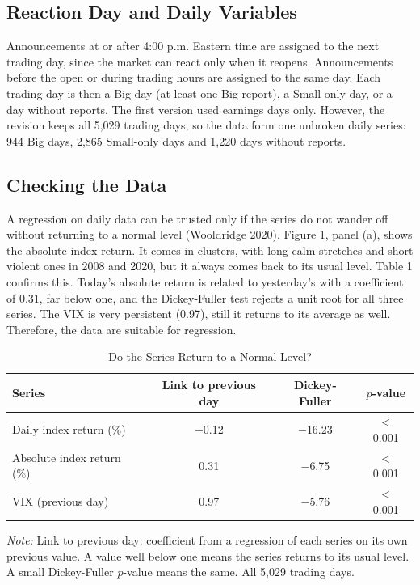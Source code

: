 \documentclass[preprint,letterpaper,11pt,authoryear]{elsarticle}
\newenvironment{tablenotes}{\par\vspace{3pt}\begin{minipage}{0.95\linewidth}\footnotesize\textit{Note:} }{\end{minipage}}
\begin{document}
\subsection{Reaction Day and Daily Variables}
Announcements at or after 4:00 p.m. Eastern time are assigned to the next trading day, since the market can react only when it reopens. Announcements before the open or during trading hours are assigned to the same day. Each trading day is then a Big day (at least one Big report), a Small-only day, or a day without reports. The first version used earnings days only. However, the revision keeps all 5,029 trading days, so the data form one unbroken daily series: 944 Big days, 2,865 Small-only days and 1,220 days without reports.

\subsection{Checking the Data}
A regression on daily data can be trusted only if the series do not wander off without returning to a normal level (Wooldridge 2020). Figure 1, panel (a), shows the absolute index return. It comes in clusters, with long calm stretches and short violent ones in 2008 and 2020, but it always comes back to its usual level. Table 1 confirms this. Today's absolute return is related to yesterday's with a coefficient of 0.31, far below one, and the Dickey-Fuller test rejects a unit root for all three series. The VIX is very persistent (0.97), still it returns to its average as well. Therefore, the data are suitable for regression.

\begin{table}[!htbp]
\centering\small\setlength{\tabcolsep}{4pt}
\caption{Do the Series Return to a Normal Level?}
\begin{tabular}{lccc}
\toprule
Series & Link to previous day & Dickey-Fuller & $p$-value \\
\midrule
Daily index return (\%) & $-$0.12 & $-$16.23 & $<$ 0.001 \\
Absolute index return (\%) & 0.31 & $-$6.75 & $<$ 0.001 \\
VIX (previous day) & 0.97 & $-$5.76 & $<$ 0.001 \\
\bottomrule
\end{tabular}
\begin{tablenotes}
Link to previous day: coefficient from a regression of each series on its own previous value. A value well below one means the series returns to its usual level. A small Dickey-Fuller $p$-value means the same. All 5,029 trading days.
\end{tablenotes}
\end{table}
\end{document}
